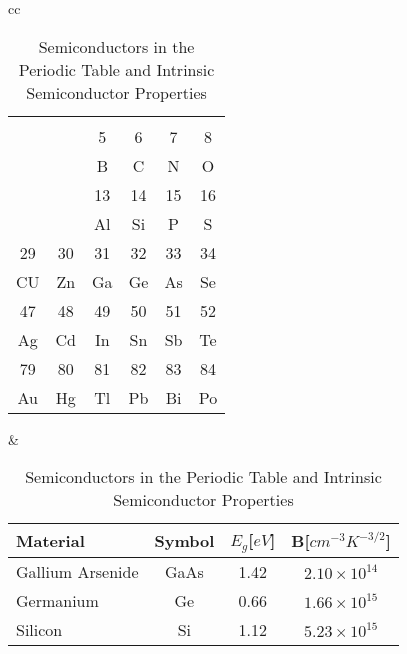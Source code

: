 \begin{table}
\caption{Semiconductors in the Periodic Table and Intrinsic Semiconductor Properties}\label{t-PeriodicTable}\label{T:IntSemi}
\begin{tabular}{cc}
\begin{tabular}{|c|c|c|c|c|c|}
\NoSide{IB}    & \NoSide{IIB}   & \NoSide{IIIA}  & \NoSide{IVA}   & \NoSide{VA}    & \NoSide{VIA}   \\
\cline{3-6}
\NoSide{}      & \RtSide{}      & 5              & 6              & 7              & 8              \\
\NoSide{}      & \RtSide{}      & B              & C              & N              & O              \\
\cline{3-6}
\NoSide{}      & \RtSide{}      & 13             & 14             & 15             & 16             \\
\NoSide{}      & \RtSide{}      & Al             & Si             & P              & S              \\
\hline
29             & 30             & 31             & 32             & 33             & 34             \\
CU             & Zn             & Ga             & Ge             & As             & Se             \\
\hline
47             & 48             & 49             & 50             & 51             & 52             \\
Ag             & Cd             & In             & Sn             & Sb             & Te             \\
\hline
79             & 80             & 81             & 82             & 83             & 84             \\
Au             & Hg             & Tl             & Pb             & Bi             & Po             \\
\hline
\end{tabular}
&
\begin{tabular}{lccc}
Material          & Symbol & $E_g$[$eV$] & B[$cm^{-3}K^{-3/2}$]\\\hline
Gallium Arsenide  & GaAs   & 1.42        & $2.10\times 10^{14}$ \\
Germanium         & Ge     & 0.66        & $1.66\times 10^{15}$ \\
Silicon           & Si     & 1.12        & $5.23\times 10^{15}$ \\
\end{tabular}
\\ \end{tabular}
\end{table}

